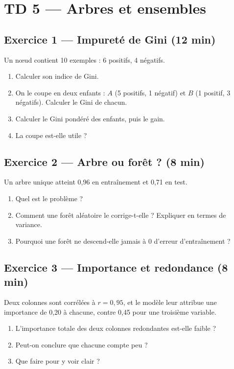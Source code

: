 \section*{TD 5 --- Arbres et ensembles}

\subsection*{Exercice 1 --- Impureté de Gini \hfill \normalfont\footnotesize (12 min)}
Un nœud contient 10 exemples : 6 positifs, 4 négatifs.
\begin{enumerate}
  \item Calculer son indice de Gini.
  \item On le coupe en deux enfants : $A$ (5 positifs, 1 négatif) et $B$
        (1 positif, 3 négatifs). Calculer le Gini de chacun.
  \item Calculer le Gini pondéré des enfants, puis le gain.
  \item La coupe est-elle utile ?
\end{enumerate}

\subsection*{Exercice 2 --- Arbre ou forêt ? \hfill \normalfont\footnotesize (8 min)}
Un arbre unique atteint 0,96 en entraînement et 0,71 en test.
\begin{enumerate}
  \item Quel est le problème ?
  \item Comment une forêt aléatoire le corrige-t-elle ? Expliquer en termes de
        variance.
  \item Pourquoi une forêt ne descend-elle jamais à 0 d'erreur d'entraînement ?
\end{enumerate}

\subsection*{Exercice 3 --- Importance et redondance \hfill \normalfont\footnotesize (8 min)}
Deux colonnes sont corrélées à $r=0{,}95$, et le modèle leur attribue une
importance de 0,20 à chacune, contre 0,45 pour une troisième variable.
\begin{enumerate}
  \item L'importance totale des deux colonnes redondantes est-elle faible ?
  \item Peut-on conclure que chacune compte peu ?
  \item Que faire pour y voir clair ?
\end{enumerate}

